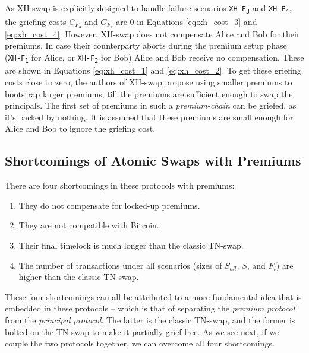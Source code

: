As XH-swap is explicitly designed to handle failure scenarios \texttt{XH-F\textsubscript{3}} and \texttt{XH-F\textsubscript{4}}, the griefing costs $C_{F_3}$ and $C_{F_4}$ are 0 in Equations \ref{eq:xh_cost_3} and \ref{eq:xh_cost_4}. However, XH-swap does not compensate Alice and Bob for their premiums. In case their counterparty aborts during the premium setup phase (\texttt{XH-F\textsubscript{1}} for Alice, or \texttt{XH-F\textsubscript{2}} for Bob) Alice and Bob receive no compensation. These are shown in Equations \ref{eq:xh_cost_1} and \ref{eq:xh_cost_2}. To get these griefing costs close to zero, the authors of XH-swap propose using smaller premiums to bootstrap larger premiums, till the premiums are sufficient enough to swap the principals. The first set of premiums in such a \textit{premium-chain} can be griefed, as it's backed by nothing. It is assumed that these premiums are small enough for Alice and Bob to ignore the griefing cost.

\subsection{Shortcomings of Atomic Swaps with Premiums} \label{section:shortcomings}
There are four shortcomings in these protocols with premiums: 
\begin{enumerate}
    \item They do not compensate for locked-up premiums.
    \item They are not compatible with Bitcoin.
    \item Their final timelock is much longer than the classic TN-swap.
    \item The number of transactions under all scenarios (sizes of $S_{all}$, $S$, and $F_{i}$) are higher than the classic TN-swap.
\end{enumerate}

\noindent
These four shortcomings can all be attributed to a more fundamental idea that is embedded in these protocols -- which is that of separating the \textit{premium protocol} from the \textit{principal protocol}. The latter is the classic TN-swap, and the former is bolted on the TN-swap to make it partially grief-free. As we see next, if we couple the two protocols together, we can overcome all four shortcomings.

